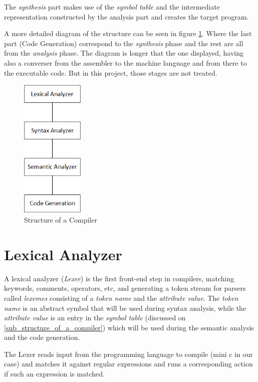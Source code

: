 \documentclass[conference]{IEEEtran}
\theoremstyle{definition}
\begin{document}
The \textit{synthesis} part makes use of the \textit{symbol table} and the intermediate representation constructed by the analysis part and creates the target program.

A more detailed diagram of the structure can be seen in figure \ref{fig_struct_of_compilator}. Where the last part (Code Generation) correspond to the \textit{synthesis} phase and the rest are all from the \textit{analysis} phase. The diagram is longer that the one displayed, having also a converser from the assembler to the machine language and from there to the executable code. But in this project, those stages are not treated.

\begin{figure}[H]
\centering
\includegraphics[width=3cm]{images/Diagram.png}
\caption{Structure of a Compiler}
\label{fig_struct_of_compilator}
\end{figure}

\section{Lexical Analyzer} \label{sec:lexical-Analizer}
A lexical analyzer (\textit{Lexer}) is the first front-end step in compilers, matching keywords, comments, operators, etc, and generating a token stream for parsers called \textit{lexemes} consisting of a \textit{token name} and the \textit{attribute value}.
The \textit{token name} is an abstract symbol that will be used during syntax analysis, while the \textit{attribute value} is an entry in the \textit{symbol table} (discussed on \ref{sub_structure_of_a_compiler}) which will be used during the semantic analysis and the code generation.

The Lexer reads input from the programming language to compile (mini c in our case) and matches it against regular expressions and runs a corresponding action if such an expression is matched.
\end{document}

